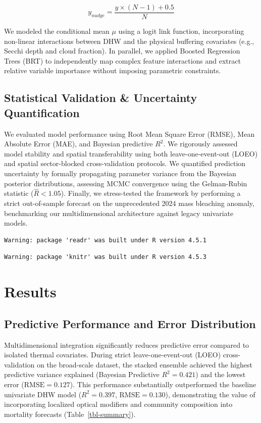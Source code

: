\documentclass[
  letterpaper,
  DIV=11,
  numbers=noendperiod]{scrartcl}
\begin{document}
\[ y_{nudge} = \frac{y \times (N - 1) + 0.5}{N} \]

We modeled the conditional mean \(\mu\) using a logit link function,
incorporating non-linear interactions between DHW and the physical
buffering covariates (e.g., Secchi depth and cloud fraction). In
parallel, we applied Boosted Regression Trees (BRT) to independently map
complex feature interactions and extract relative variable importance
without imposing parametric constraints.

\subsection{Statistical Validation \& Uncertainty
Quantification}\label{statistical-validation-uncertainty-quantification}

We evaluated model performance using Root Mean Square Error (RMSE), Mean
Absolute Error (MAE), and Bayesian predictive \(R^2\). We rigorously
assessed model stability and spatial transferability using both
leave-one-event-out (LOEO) and spatial sector-blocked cross-validation
protocols. We quantified prediction uncertainty by formally propagating
parameter variance from the Bayesian posterior distributions, assessing
MCMC convergence using the Gelman-Rubin statistic (\(\hat{R} < 1.05\)).
Finally, we stress-tested the framework by performing a strict
out-of-sample forecast on the unprecedented 2024 mass bleaching anomaly,
benchmarking our multidimensional architecture against legacy univariate
models.

\begin{verbatim}
Warning: package 'readr' was built under R version 4.5.1
\end{verbatim}

\begin{verbatim}
Warning: package 'knitr' was built under R version 4.5.3
\end{verbatim}

\section{Results}\label{results}

\subsection{Predictive Performance and Error
Distribution}\label{predictive-performance-and-error-distribution}

Multidimensional integration significantly reduces predictive error
compared to isolated thermal covariates. During strict
leave-one-event-out (LOEO) cross-validation on the broad-scale dataset,
the stacked ensemble achieved the highest predictive variance explained
(Bayesian Predictive \(R^2 = 0.421\)) and the lowest error
(\(\text{RMSE} = 0.127\)). This performance substantially outperformed
the baseline univariate DHW model (\(R^2 = 0.397\),
\(\text{RMSE} = 0.130\)), demonstrating the value of incorporating
localized optical modifiers and community composition into mortality
forecasts (Table~\ref{tbl-summary}).
\end{document}
